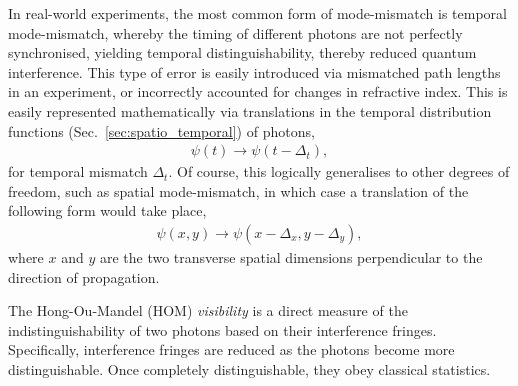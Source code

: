 In real-world experiments, the most common form of mode-mismatch is temporal mode-mismatch, whereby the timing of different photons are not perfectly synchronised, yielding temporal distinguishability, thereby reduced quantum interference. This type of error is easily introduced via mismatched path lengths in an experiment, or incorrectly accounted for changes in refractive index. This is easily represented mathematically via translations in the temporal distribution functions (Sec.~\ref{sec:spatio_temporal}) of photons,
\begin{align} \label{eq:mode_mismatch_shift}
\psi(t) \to \psi(t-\Delta_t),
\end{align}
for temporal mismatch $\Delta_t$. Of course, this logically generalises to other degrees of freedom, such as spatial mode-mismatch, in which case a translation of the following form would take place,
\begin{align}
\psi(x,y) \to \psi(x-\Delta_x,y-\Delta_y),
\end{align}
where $x$ and $y$ are the two transverse spatial dimensions perpendicular to the direction of propagation.

The Hong-Ou-Mandel (HOM) \cite{bib:HOM87} \textit{visibility} is a direct measure of the indistinguishability of two photons based on their interference fringes. Specifically, interference fringes are reduced as the photons become more distinguishable. Once completely distinguishable, they obey classical statistics.

